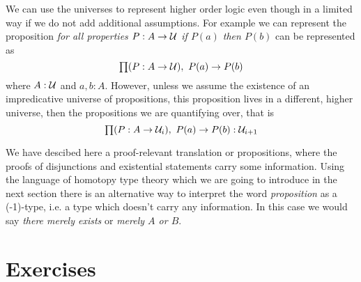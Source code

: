 We can use the universes to represent higher order logic even though in a limited way if we do not add additional assumptions. For example we can represent the proposition \emph{for all properties $P : A \to \mathcal{U}$ if $P(a)$ then $P(b)$} can be represented as
\[ \prd{P : A \to \UU} P(a) \to P(b) \]
where $A : \mathcal{U}$ and $a,b : A$. However, unless we assume the existence
of an impredicative universe of propositions, this
proposition  lives in a different, higher universe, then the
propositions we are quantifying over, that is
\[ \prd{P : A \to \UU_i} P(a) \to P(b) : \UU_{i+1} \]

We have descibed here a proof-relevant translation or propositions, where the proofs of disjunctions and existential statements carry some information. Using the language of homotopy type theory which we are going to introduce in the next section there is an alternative way to interpret the word \emph{proposition} as a (-1)-type, i.e. a type which doesn't carry any information. In this case we would say \emph{there merely exists} or \emph{merely $A$ or $B$}.

\section*{Exercises}

